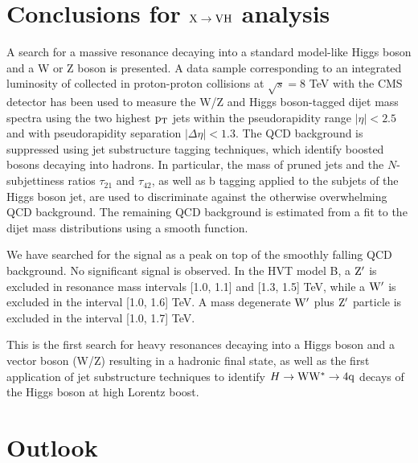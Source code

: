 \section{Conclusions for ${\rm X \to VH}$ analysis}
A search for a massive resonance decaying 
into a standard model-like Higgs boson and a W or Z boson is presented.
A data sample corresponding to an integrated luminosity of \intlumi
collected in proton-proton 
collisions at $\sqrt{s}=8$ TeV with the CMS detector
has been used to measure the W/Z and Higgs boson-tagged 
dijet mass spectra
using the two highest $\mathrm{p_{T}}$ jets within the pseudorapidity range $|\eta| <
2.5$ and with pseudorapidity separation $|\Delta\eta| < 1.3$.  The QCD
background is suppressed using 
 jet substructure tagging techniques,
which identify boosted bosons decaying into hadrons.  In particular, 
the mass of pruned jets and the $N$-subjettiness ratios
$\tau_{21}$ and $\tau_{42}$, as well as b tagging applied to the subjets
of the Higgs boson jet, are used to discriminate
against the otherwise overwhelming QCD background.  The remaining QCD
background is estimated from a fit to the dijet mass distributions using a smooth function. 

We have searched for the signal as a peak on top of the smoothly
falling QCD background.  No significant signal is observed. 
In the HVT model B, 
a ${\rm Z'}$ is excluded in resonance mass intervals [1.0, 1.1] and 
[1.3, 1.5] TeV, while a ${\rm W'}$ is excluded in the interval [1.0, 1.6] TeV.  
A mass degenerate 
${\rm W'}$ plus ${\rm Z'}$ particle is excluded in the interval [1.0, 1.7] TeV.  

This is the first search for heavy resonances decaying into
a Higgs boson and a vector boson (W/Z) 
resulting in a hadronic final state,
as well as the first application of jet substructure techniques
to identify 
$H \to {\rm W}{\rm W}^*\to4{\rm q}$ decays of the Higgs boson at high Lorentz boost.

\section{Outlook}

